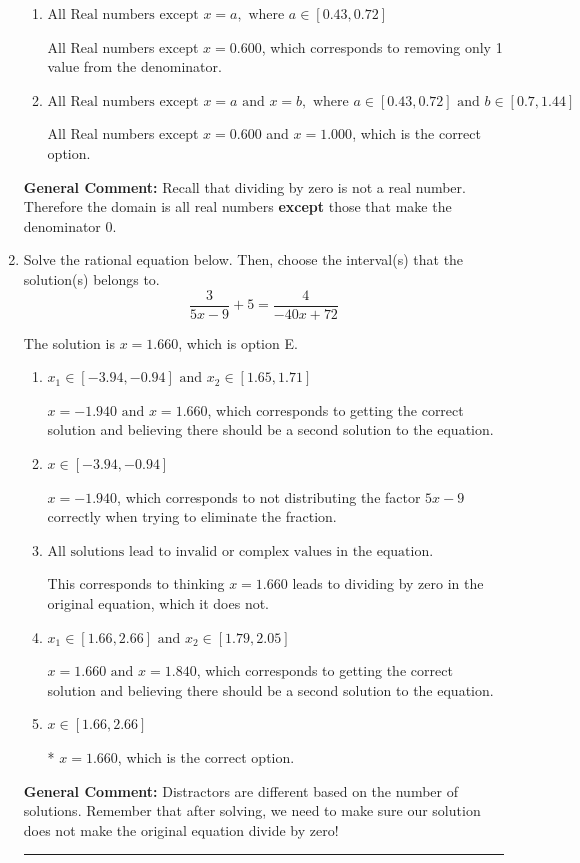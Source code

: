 \documentclass{extbook}[14pt]
\newcommand{\litem}[1]{\item #1

\rule{\textwidth}{0.4pt}}
\begin{document}
\begin{enumerate}
{\begin{enumerate}[label=\Alph*.]
This corresponds to thinking the denominator has complex roots or that rational functions have a domain of all Real numbers.
\item \( \text{All Real numbers except } x = a, \text{ where } a \in [0.43, 0.72] \)

All Real numbers except $x = 0.600$, which corresponds to removing only 1 value from the denominator.
\item \( \text{All Real numbers except } x = a \text{ and } x = b, \text{ where } a \in [0.43, 0.72] \text{ and } b \in [0.7, 1.44] \)

All Real numbers except $x = 0.600$ and $x = 1.000$, which is the correct option.
\end{enumerate}

\textbf{General Comment:} Recall that dividing by zero is not a real number. Therefore the domain is all real numbers \textbf{except} those that make the denominator 0.
}
\litem{
Solve the rational equation below. Then, choose the interval(s) that the solution(s) belongs to.
\[ \frac{3}{5x -9} + 5 = \frac{4}{-40x + 72} \]

The solution is \( x = 1.660 \), which is option E.\begin{enumerate}[label=\Alph*.]
\item \( x_1 \in [-3.94, -0.94] \text{ and } x_2 \in [1.65,1.71] \)

$x = -1.940 \text{ and } x = 1.660$, which corresponds to getting the correct solution and believing there should be a second solution to the equation.
\item \( x \in [-3.94,-0.94] \)

$x = -1.940$, which corresponds to not distributing the factor $5x -9$ correctly when trying to eliminate the fraction.
\item \( \text{All solutions lead to invalid or complex values in the equation.} \)

This corresponds to thinking $x = 1.660$ leads to dividing by zero in the original equation, which it does not.
\item \( x_1 \in [1.66, 2.66] \text{ and } x_2 \in [1.79,2.05] \)

$x = 1.660 \text{ and } x = 1.840$, which corresponds to getting the correct solution and believing there should be a second solution to the equation.
\item \( x \in [1.66,2.66] \)

* $x = 1.660$, which is the correct option.
\end{enumerate}

\textbf{General Comment:} Distractors are different based on the number of solutions. Remember that after solving, we need to make sure our solution does not make the original equation divide by zero!
}
\end{enumerate}
\end{document}
